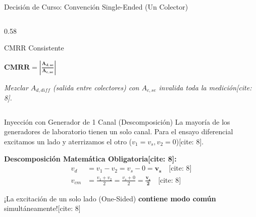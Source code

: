 \documentclass[aspectratio=169]{beamer}
\begin{document}
\begin{frame}{Decisión de Curso: Convención Single-Ended (Un Colector)}
\begin{columns}[c]
\begin{column}{0.58\textwidth}
            \vspace{0.1cm}
            \begin{alertblock}{CMRR Consistente}
                \begin{center}
                    $\displaystyle \mathbf{CMRR = \left| \frac{A_{d,se}}{A_{c,se}} \right|}$ \quad \text{[cite: 8]}
                \end{center}
                \vspace{0.1cm}
                \textit{Mezclar $A_{d,diff}$ (salida entre colectores) con $A_{c,se}$ invalida toda la medición[cite: 8].}
            \end{alertblock}
        \end{column}
    \end{columns}
\end{frame}

\begin{frame}{Inyección con Generador de 1 Canal (Descomposición)}
    La mayoría de los generadores de laboratorio tienen un solo canal. Para el ensayo diferencial excitamos un lado y aterrizamos el otro ($v_1 = v_s, v_2 = 0$)[cite: 8].
    
    \vspace{0.3cm}
    \textbf{Descomposición Matemática Obligatoria[cite: 8]:}
    \begin{align*}
        v_d &= v_1 - v_2 = v_s - 0 = \mathbf{v_s} \quad \text{[cite: 8]} \\
        v_{cm} &= \frac{v_1 + v_2}{2} = \frac{v_s + 0}{2} = \mathbf{\frac{v_s}{2}} \quad \text{[cite: 8]}
    \end{align*}
    
    \vspace{0.3cm}
    \begin{tcolorbox}[colback=yellow!10, colframe=orange, title=\textbf{Implicación Física[cite: 8]}]
        ¡La excitación de un solo lado (One-Sided) \textbf{contiene modo común} simultáneamente![cite: 8]
    \end{tcolorbox}
\end{frame}
\end{document}
